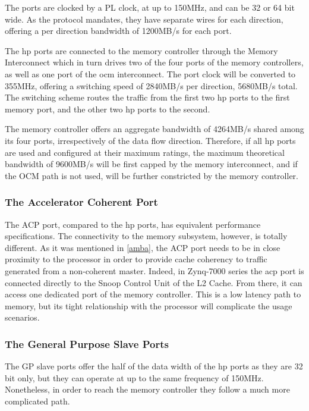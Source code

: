 The ports are clocked by a PL clock, at up to 150MHz, and can be 32 or 64 bit wide.
As the  protocol mandates, they have separate wires for each direction,
offering a per direction bandwidth of 1200MB/s for each port.

The \gls{hp} ports are connected to the memory controller through the Memory Interconnect
which in turn drives two of the four ports of the memory controllers, as well as
one port of the \acrfull{ocm} interconnect.
The port clock will be converted to 355MHz,
offering a switching speed of 2840MB/s per direction, 5680MB/s total.
The switching scheme routes the traffic from the first
two \gls{hp} ports to the first memory port, and the other two \gls{hp} ports
to the second. 

The memory controller offers an aggregate bandwidth of 4264MB/s 
shared among its four ports, irrespectively of the data flow direction.
Therefore, if all \gls{hp} ports are used and configured at their maximum ratings,
the maximum theoretical bandwidth of 9600MB/s will be first capped by the
memory interconnect, and if the OCM path is not used, will be further constricted
by the memory controller.

\subsubsection{The Accelerator Coherent Port}

The ACP port, compared to the \gls{hp} ports, 
has equivalent performance specifications.
The connectivity to the memory subsystem, 
however, is totally different.
As it was mentioned in \ref{amba}, 
the ACP port needs to be in close proximity to the
processor in order to provide cache coherency 
to traffic generated from a non-coherent  master.
Indeed, in Zynq-7000 series the \gls{acp} port is connected 
directly to the Snoop Control Unit of the L2 Cache. 
From there, it can access one dedicated 
port of the memory controller.
This is a low latency path to memory, 
but its tight relationship with the processor
will complicate the usage scenarios.

\subsubsection{The General Purpose Slave Ports}

The GP slave ports offer the half of the data width 
of the \gls{hp} ports as they are 32 bit only,
but they can operate at up to the same frequency of 150MHz. 
Nonetheless, in order to reach the memory controller 
they follow a much more complicated path.

